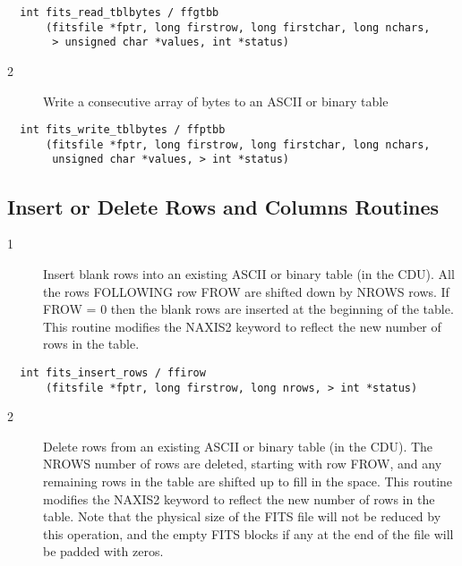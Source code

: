 \begin{verbatim}
  int fits_read_tblbytes / ffgtbb
      (fitsfile *fptr, long firstrow, long firstchar, long nchars,
       > unsigned char *values, int *status)
\end{verbatim}

\begin{description}
\item[2 ] Write a consecutive array of bytes to an ASCII or binary table
\end{description}

\begin{verbatim}
  int fits_write_tblbytes / ffptbb
      (fitsfile *fptr, long firstrow, long firstchar, long nchars,
       unsigned char *values, > int *status)
\end{verbatim}

\subsection{ Insert or Delete Rows and Columns Routines \label{FFIROW}}


\begin{description}
\item[1 ] Insert blank rows into an existing ASCII or binary table (in the CDU).
    All the rows FOLLOWING row FROW are shifted down by NROWS rows.  If
    FROW = 0 then the blank rows are inserted at the beginning of the
    table.  This routine modifies the NAXIS2 keyword to reflect the new
   number of rows in the table.
\end{description}

\begin{verbatim}
  int fits_insert_rows / ffirow
      (fitsfile *fptr, long firstrow, long nrows, > int *status)
\end{verbatim}

\begin{description}
\item[2 ] Delete rows from an existing ASCII or binary table (in the CDU).
    The NROWS number of rows are deleted, starting with row FROW, and
    any remaining rows in the table are shifted up to fill in the space.
    This routine modifies the NAXIS2 keyword to reflect the new number
    of rows in the table.  Note that the physical size of the FITS file will
    not be reduced by this operation, and the empty FITS blocks if any
   at the end of the file will be padded with zeros.
\end{description}

